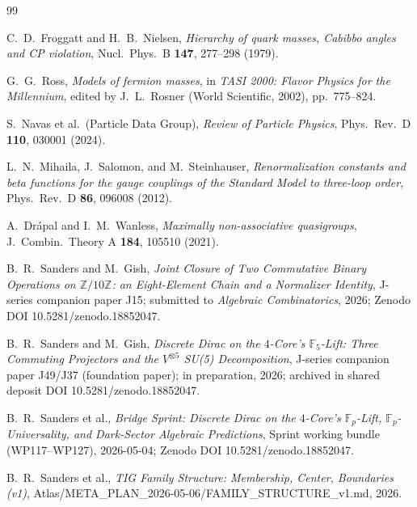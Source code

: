 \documentclass[11pt,reqno]{amsart}
\theoremstyle{plain}
\theoremstyle{definition}
\theoremstyle{remark}
\newcommand{\F}{\mathbb{F}}
\begin{document}
\begin{thebibliography}{99}

C.~D.~Froggatt and H.~B.~Nielsen,
\emph{Hierarchy of quark masses, Cabibbo angles and CP
violation},
Nucl.\ Phys.\ B \textbf{147}, 277--298 (1979).

G.~G.~Ross,
\emph{Models of fermion masses},
in \emph{TASI 2000: Flavor Physics for the Millennium}, edited
by J.~L.~Rosner (World Scientific, 2002), pp.\ 775--824.

S.~Navas et al.\ (Particle Data Group),
\emph{Review of Particle Physics},
Phys.\ Rev.\ D \textbf{110}, 030001 (2024).

L.~N.~Mihaila, J.~Salomon, and M.~Steinhauser,
\emph{Renormalization constants and beta functions for the
gauge couplings of the Standard Model to three-loop order},
Phys.\ Rev.\ D \textbf{86}, 096008 (2012).

A.~Dr\'apal and I.~M.~Wanless,
\emph{Maximally non-associative quasigroups},
J.\ Combin.\ Theory A \textbf{184}, 105510 (2021).

B.~R.~Sanders and M.~Gish,
\emph{Joint Closure of Two Commutative Binary Operations on
$\mathbb{Z}/10\mathbb{Z}$: an Eight-Element Chain and a
Normalizer Identity},
J-series companion paper J15; submitted to
\emph{Algebraic Combinatorics}, 2026;
Zenodo DOI 10.5281/zenodo.18852047.

B.~R.~Sanders and M.~Gish,
\emph{Discrete Dirac on the $4$-Core's $\F_{5}$-Lift:
Three Commuting Projectors and the $V^{\otimes 5}$ SU(5)
Decomposition},
J-series companion paper J49/J37 (foundation paper);
in preparation, 2026;
archived in shared deposit DOI 10.5281/zenodo.18852047.

B.~R.~Sanders et al.,
\emph{Bridge Sprint: Discrete Dirac on the $4$-Core's
$\F_{p}$-Lift, $\F_{p}$-Universality, and Dark-Sector
Algebraic Predictions},
Sprint working bundle (WP117--WP127), 2026-05-04;
Zenodo DOI 10.5281/zenodo.18852047.

B.~R.~Sanders et al.,
\emph{TIG Family Structure: Membership, Center, Boundaries
(v1)},
Atlas/META\_PLAN\_2026-05-06/FAMILY\_STRUCTURE\_v1.md, 2026.

\end{thebibliography}
\end{document}
